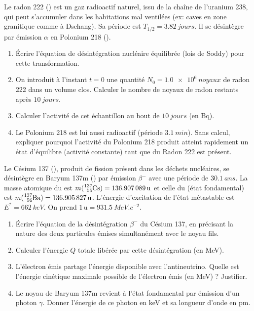 \documentclass[11pt]{article}
\begin{document}
\begin{exercice}
Le radon 222 () est un gaz radioactif naturel, issu de la chaîne de l'uranium 238, qui peut s'accumuler dans les habitations mal ventilées (ex: caves en zone granitique comme à Dschang). Sa période est $T_{1/2} = \SI{3.82}{jours}$. Il se désintègre par émission $\alpha$ en Polonium 218 ().
\begin{enumerate}
    \item Écrire l'équation de désintégration nucléaire équilibrée (lois de Soddy) pour cette transformation.
    \item On introduit à l'instant $t=0$ une quantité $N_0 = \SI{1.0e6}{noyaux}$ de radon 222 dans un volume clos. Calculer le nombre de noyaux de radon restants après $\SI{10}{jours}$.
    \item Calculer l'activité de cet échantillon au bout de $\SI{10}{jours}$ (en Bq).
    \item Le Polonium 218 est lui aussi radioactif (période $\SI{3.1}{min}$). Sans calcul, expliquer pourquoi l'activité du Polonium 218 produit atteint rapidement un état d'équilibre (activité constante) tant que du Radon 222 est présent.
\end{enumerate}
\end{exercice}

\begin{exercice}
Le Césium 137 (), produit de fission présent dans les déchets nucléaires, se désintègre en Baryum 137m () par émission $\beta^-$ avec une période de $\SI{30.1}{ans}$. La masse atomique du  est $m(\ce{^{137}_{55}Cs}) = \SI{136.907089}{u}$ et celle du  (état fondamental) est $m(\ce{^{137}_{56}Ba}) = \SI{136.905827}{u}$. L'énergie d'excitation de l'état métastable  est $E^* = \SI{662}{keV}$. On prend $1\,\text{u} = \SI{931.5}{MeV.c^{-2}}$.
\begin{enumerate}
    \item Écrire l'équation de la désintégration $\beta^-$ du Césium 137, en précisant la nature des deux particules émises simultanément avec le noyau fils.
    \item Calculer l'énergie $Q$ totale libérée par cette désintégration (en MeV).
    \item L'électron émis partage l'énergie disponible avec l'antineutrino. Quelle est l'énergie cinétique maximale possible de l'électron émis (en MeV) ? Justifier.
    \item Le noyau de Baryum 137m revient à l'état fondamental par émission d'un photon $\gamma$. Donner l'énergie de ce photon en keV et sa longueur d'onde en pm.
\end{enumerate}
\end{exercice}
\end{document}
